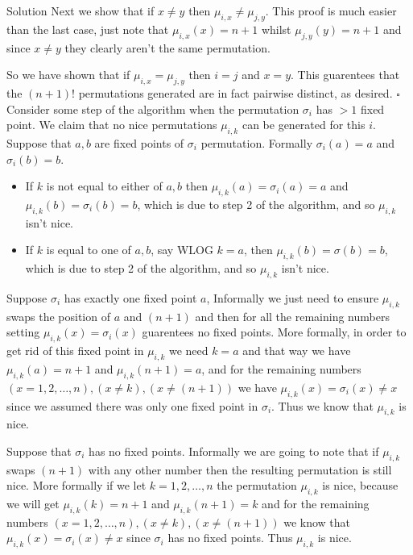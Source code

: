 \documentclass{article}
\begin{document}
\begin{solution}{Solution}
Next we show that if $x\neq y$ then $\mu_{i,x} \neq \mu_{j,y}$. This
proof is much easier than the last case, just note that
$\mu_{i,x}(x) = n+1$ whilst $\mu_{j,y}(y) = n+1$ and since $x\neq y$ they
clearly aren't the same permutation. \vspace{0.2cm}

So we have shown that if $\mu_{i,x} = \mu_{j,y}$ then $i = j$ and $x = y$.
This guarentees that the $(n+1)!$ permutations generated are in fact
pairwise distinct, as desired.
$\square$ \\

Consider some step of the algorithm when the permutation $\sigma_i$ has
$> 1$ fixed point. We claim that no nice permutations $\mu_{i,k}$
can be generated for this $i$. Suppose that $a,b$ are fixed points of
$\sigma_i$ permutation. Formally $\sigma_i(a) = a$ and $\sigma_i(b) = b$.

\begin{itemize}
\item If $k$ is not equal to either of $a,b$ then
$\mu_{i,k}(a) = \sigma_i(a) = a$ and $\mu_{i,k}(b) = \sigma_i(b) = b$,
which is due to step 2 of the algorithm,
and so $\mu_{i,k}$ isn't nice.

\item If $k$ is equal to one of $a,b$, say WLOG $k = a$, then
$\mu_{i,k}(b) = \sigma(b) = b$, which is due to step 2 of the algorithm,
and so $\mu_{i,k}$ isn't nice.
\end{itemize}

Suppose $\sigma_i$ has exactly one fixed point $a$,
Informally we just need to ensure $\mu_{i,k}$ swaps the position of $a$ and
$(n+1)$ and then for all the remaining numbers setting
$\mu_{i,k}(x) = \sigma_i(x)$ guarentees no fixed points.
More formally, in order to get rid of
this fixed point in $\mu_{i,k}$ we need $k = a$ and that way we have
$\mu_{i,k}(a) = n+1$ and $\mu_{i,k}(n+1) = a$, and for the remaining numbers
$(x=1,2,\ldots,n), (x\neq k), (x\neq (n+1))$ we have
$\mu_{i,k}(x) = \sigma_i(x) \neq x$ since we assumed there
was only one fixed point in $\sigma_i$.  Thus we know that $\mu_{i,k}$ is
nice.
\vspace{0.2cm}

Suppose that $\sigma_i$ has no fixed points. Informally we are going
to note that if $\mu_{i,k}$ swaps $(n+1)$ with any other number then the
resulting permutation is still nice. More formally if we let
$k=1,2,\ldots,n$ the permutation $\mu_{i,k}$ is nice, because we will get
$\mu_{i,k}(k) = n+1$ and $\mu_{i,k}(n+1) = k$ and for the remaining numbers
$(x=1,2,\ldots,n), (x\neq k), (x\neq (n+1))$ we know that
$\mu_{i,k}(x) = \sigma_i(x) \neq x$ since $\sigma_i$ has no fixed points.
Thus $\mu_{i,k}$ is nice.\\


\end{solution}
\end{document}
